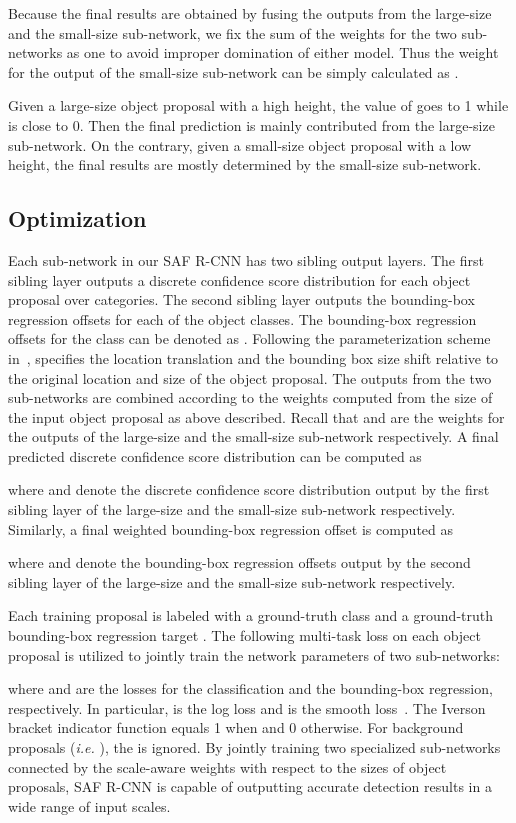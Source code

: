 \documentclass[journal]{IEEEtran}
\begin{document}
Because the final results are obtained by fusing the outputs from the large-size and the small-size sub-network, we fix the sum of the weights for the two sub-networks as one to avoid improper domination of either model. Thus the weight for the output of the small-size sub-network  can be simply calculated as .

Given a large-size object proposal with a high height, the value of  goes to 1 while  is close to 0. Then the final prediction is mainly contributed from the large-size sub-network. On the contrary, given a small-size object proposal with a low height, the final results are mostly determined by the small-size sub-network.


\subsection{Optimization}
Each sub-network in our SAF R-CNN has two sibling output layers. The first sibling layer outputs a discrete confidence score distribution  for each object proposal over  categories. The second sibling layer outputs the bounding-box regression offsets for each of the  object classes. The bounding-box regression offsets for the class  can be denoted as . Following the parameterization scheme in~\cite{girshick2014rich},  specifies the location translation and the bounding box size shift relative to the original location and size of the object proposal. The outputs from the two sub-networks are combined according to the weights computed from the size of the input object proposal as above described. Recall that  and  are the weights for the outputs of the large-size and the small-size sub-network respectively. A final predicted discrete confidence score distribution can be computed as


where  and  denote the discrete confidence score distribution output by the first sibling layer of the large-size and the small-size sub-network respectively. Similarly, a final weighted bounding-box regression offset is computed as


where  and  denote the bounding-box regression offsets output by the second sibling layer of the large-size and the small-size sub-network respectively. 

Each training proposal is labeled with a ground-truth class  and a ground-truth bounding-box regression target . The following multi-task loss  on each object proposal is utilized to jointly train the network parameters of two sub-networks:

where  and  are the losses for the classification and the bounding-box regression, respectively. In particular,  is the log loss and  is the smooth  loss~\cite{girshick2015fast}. The Iverson bracket indicator function  equals 1 when  and 0 otherwise. For background proposals (\emph{i.e. }), the  is ignored. By jointly training two specialized sub-networks connected by the scale-aware weights with respect to the sizes of object proposals, SAF R-CNN is capable of outputting accurate detection results in a wide range of input scales.
\end{document}
